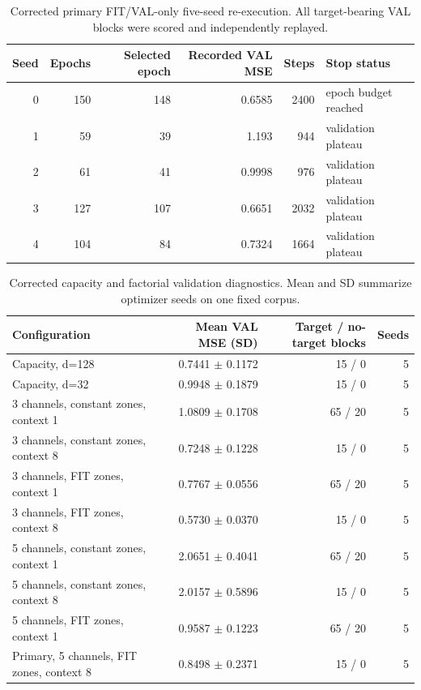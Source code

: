 \documentclass[9pt,twocolumn]{article}
\begin{document}
\begin{table}[t]\centering\caption{Corrected primary FIT/VAL-only five-seed re-execution. All target-bearing VAL blocks were scored and independently replayed.}\begin{tabular}{rrrrrl}\toprule Seed & Epochs & Selected epoch & Recorded VAL MSE & Steps & Stop status\\\midrule
0 & 150 & 148 & 0.6585 & 2400 & epoch budget reached\\
1 & 59 & 39 & 1.193 & 944 & validation plateau\\
2 & 61 & 41 & 0.9998 & 976 & validation plateau\\
3 & 127 & 107 & 0.6651 & 2032 & validation plateau\\
4 & 104 & 84 & 0.7324 & 1664 & validation plateau\\
\bottomrule\end{tabular}\end{table}
\begin{table}[t]\centering\caption{Corrected capacity and factorial validation diagnostics. Mean and SD summarize optimizer seeds on one fixed corpus.}\begin{tabular}{lrrr}\toprule Configuration & Mean VAL MSE (SD) & Target / no-target blocks & Seeds\\\midrule
Capacity, d=128 & 0.7441 $\pm$ 0.1172 & 15 / 0 & 5\\
Capacity, d=32 & 0.9948 $\pm$ 0.1879 & 15 / 0 & 5\\
3 channels, constant zones, context 1 & 1.0809 $\pm$ 0.1708 & 65 / 20 & 5\\
3 channels, constant zones, context 8 & 0.7248 $\pm$ 0.1228 & 15 / 0 & 5\\
3 channels, FIT zones, context 1 & 0.7767 $\pm$ 0.0556 & 65 / 20 & 5\\
3 channels, FIT zones, context 8 & 0.5730 $\pm$ 0.0370 & 15 / 0 & 5\\
5 channels, constant zones, context 1 & 2.0651 $\pm$ 0.4041 & 65 / 20 & 5\\
5 channels, constant zones, context 8 & 2.0157 $\pm$ 0.5896 & 15 / 0 & 5\\
5 channels, FIT zones, context 1 & 0.9587 $\pm$ 0.1223 & 65 / 20 & 5\\
Primary, 5 channels, FIT zones, context 8 & 0.8498 $\pm$ 0.2371 & 15 / 0 & 5\\
\bottomrule\end{tabular}\end{table}
\end{document}
